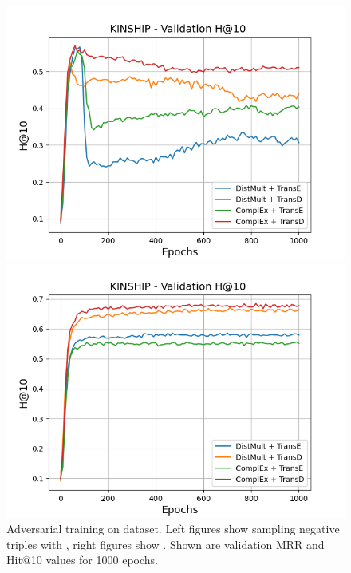 \begin{figure}[H]
\begin{minipage}{.5\textwidth}
    \end{minipage}
    \begin{minipage}{.5\textwidth}
      \centering
      \includegraphics[width=0.9\linewidth]{figures/results/gan_train/not_pretrained/uncertainty/max/entropy/kinship/1k_epochs/uncertainty_kinship_hit10.png}
    \end{minipage}%
    \begin{minipage}{.5\textwidth}
      \centering
      \includegraphics[width=0.9\linewidth]{figures/results/gan_train/not_pretrained/uncertainty/max_distribution/entropy/kinship/1k_epochs/uncertainty_kinship_hit10.png}
    \end{minipage}%
    \caption{Adversarial training on \kinship dataset. 
   Left figures show sampling negative triples with \usmax, right figures show \ussoftmax.
    Shown are validation MRR and Hit@10 values for 1000 epochs.}
    \label{fig:advtrain_kinship_usmax_ussoftmax}
\end{figure}
